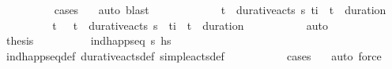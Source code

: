 \begin{isabellebody}
\ \ \ \ \ \ \ \ \isamarkupfalse%
\ {\isacharparenleft}{\kern0pt}cases\ {\isasympi}{\isacharparenright}{\kern0pt}\ \isamarkupfalse%
\ auto\ blast{\isacharplus}{\kern0pt}\isanewline
\ \ \ \ \isamarkupfalse%
\isanewline
\ \ \ \ \ \ \isamarkupfalse%
\ {\isachardoublequoteopen}{\isasymexists}{\isacharparenleft}{\kern0pt}t\isactrlsub {\isasympi}{\isacharcomma}{\kern0pt}{\isasympi}{\isacharparenright}{\kern0pt}\ {\isasymin}\ durative{\isacharunderscore}{\kern0pt}acts\ {\isasympi}s{\isachardot}{\kern0pt}\ t\isactrlsub i\ {\isacharequal}{\kern0pt}\ t\isactrlsub {\isasympi}\ {\isacharplus}{\kern0pt}\ {\isacharparenleft}{\kern0pt}duration\ {\isasympi}{\isacharparenright}{\kern0pt}{\isachardoublequoteclose}\isanewline
\ \ \ \ \ \ \isamarkupfalse%
\ \isamarkupfalse%
\ t\isactrlsub {\isasympi}\ {\isasympi}\ \ {\isachardoublequoteopen}{\isacharparenleft}{\kern0pt}t\isactrlsub {\isasympi}{\isacharcomma}{\kern0pt}{\isasympi}{\isacharparenright}{\kern0pt}\ {\isasymin}\ durative{\isacharunderscore}{\kern0pt}acts\ {\isasympi}s{\isachardoublequoteclose}\ \ {\isachardoublequoteopen}t\isactrlsub i\ {\isacharequal}{\kern0pt}\ t\isactrlsub {\isasympi}\ {\isacharplus}{\kern0pt}\ {\isacharparenleft}{\kern0pt}duration\ {\isasympi}{\isacharparenright}{\kern0pt}{\isachardoublequoteclose}\isanewline
\ \ \ \ \ \ \ \ \isamarkupfalse%
\ auto\isanewline
\ \ \ \ \ \ \isamarkupfalse%
\ \isamarkupfalse%
\ {\isacharquery}{\kern0pt}thesis\isanewline
\ \ \ \ \ \ \ \ \isamarkupfalse%
\ {\isacartoucheopen}ind{\isacharunderscore}{\kern0pt}happ{\isacharunderscore}{\kern0pt}seq\ {\isasympi}s\ hs{\isacartoucheclose}\isanewline
\ \ \ \ \ \ \ \ \isamarkupfalse%
\ ind{\isacharunderscore}{\kern0pt}happ{\isacharunderscore}{\kern0pt}seq{\isacharunderscore}{\kern0pt}def\ durative{\isacharunderscore}{\kern0pt}acts{\isacharunderscore}{\kern0pt}def\ simple{\isacharunderscore}{\kern0pt}acts{\isacharunderscore}{\kern0pt}def\ \isanewline
\ \ \ \ \ \ \ \ \isamarkupfalse%
\ {\isacharparenleft}{\kern0pt}cases\ {\isasympi}{\isacharparenright}{\kern0pt}\ \isamarkupfalse%
\ auto\ force{\isacharplus}{\kern0pt}\isanewline
\ \ \ \ \isamarkupfalse%
\isanewline
\ \ \isamarkupfalse%
%
\endisatagproof
{\isafoldproof}%
%
\isadelimproof
\isanewline
%
\endisadelimproof
\isanewline
\ \ \isamarkupfalse%

\end{isabellebody}
